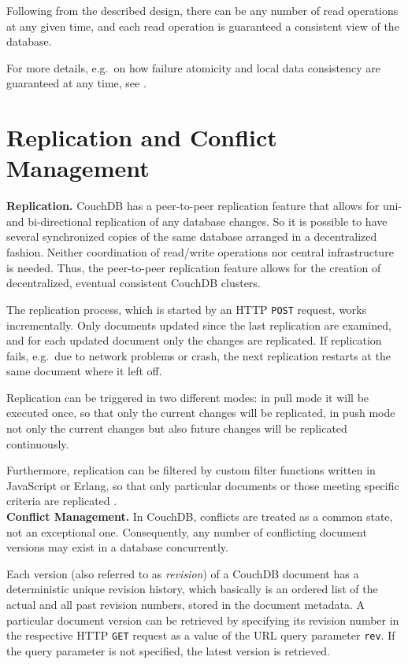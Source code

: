 Following from the described design, there can be any number of read operations at any given time, and each read operation is guaranteed a consistent view of the database.

For more details, e.g.\ on how failure atomicity and local data consistency are guaranteed at any time, see \cite[p.~233ff]{ASL10}.


\section{Replication and Conflict Management}
\label{Replication and Conflict Management}

{\bf Replication.}
CouchDB has a peer-to-peer replication feature that allows for uni- and bi-directional replication of any database changes. So it is possible to have several synchronized copies of the same database arranged in a decentralized fashion. Neither coordination of read/write operations nor central infrastructure is needed. Thus, the peer-to-peer replication feature allows for the creation of decentralized, eventual consistent CouchDB clusters.

The replication process, which is started by an HTTP {\tt POST} request, works incrementally. Only documents updated since the last replication are examined, and for each updated document only the changes are replicated. If replication fails, e.g.\ due to network problems or crash, the next replication restarts at the same document where it left off.

Replication can be triggered in two different modes: in pull mode it will be executed once, so that only the current changes will be replicated, in push mode not only the current changes but also future changes will be replicated continuously.

Furthermore, replication can be filtered by custom filter functions written in JavaScript or Erlang, so that only particular documents or those meeting specific criteria are replicated \cite[p.~149ff]{ASL10} \cite{Apa10}.\\

\noindent
{\bf Conflict Management.}
In CouchDB, conflicts are treated as a common state, not an exceptional one. Consequently, any number of conflicting document versions may exist in a database concurrently.

Each version (also referred to as \emph{revision}) of a CouchDB document has a deterministic unique revision history, which basically is an ordered list of the actual and all past revision numbers, stored in the document metadata. A particular document version can be retrieved by specifying its revision number in the respective HTTP {\tt GET} request as a value of the URL query parameter {\tt rev}. If the query parameter is not specified, the latest version is retrieved.


